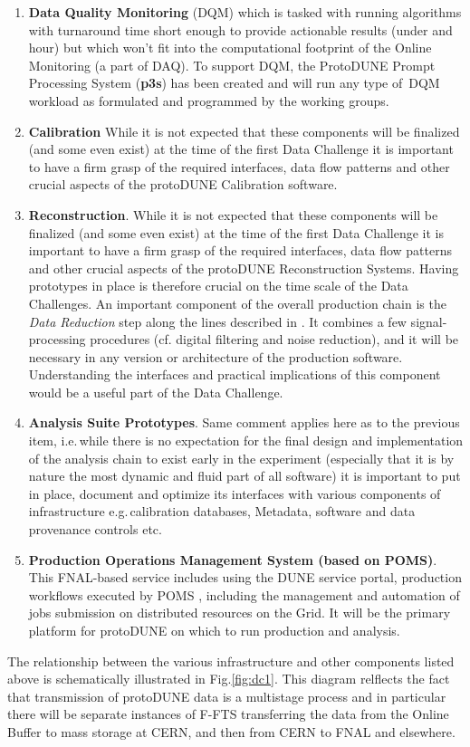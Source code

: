 \documentclass[pdftex,12pt,letter]{article}
\newcommand{\pd}{protoDUNE\xspace}
\begin{document}
\begin{enumerate}
\item \textbf{Data Quality Monitoring} (DQM) which is tasked with running algorithms with turnaround time short enough to provide
actionable results (under and hour) but which won't fit into the computational footprint of the Online Monitoring (a part of DAQ).
To support DQM, the ProtoDUNE Prompt Processing System (\textbf{p3s}) \cite{docdb1811,p3s} has been created and will run any type of\
DQM workload as formulated and programmed by the working groups.

\item \textbf{Calibration} While it is not expected that these components will be finalized
(and some even exist) at the time of the first Data Challenge it is important to have a firm grasp of the required interfaces,
data flow patterns and other crucial aspects of the \pd Calibration software.
 \item \textbf{Reconstruction}. While it is not expected that these components will be finalized
(and some even exist) at the time of the first Data Challenge it is important to have a firm grasp of the required interfaces,
data flow patterns and other crucial aspects of the \pd Reconstruction Systems. Having prototypes in place is therefore crucial
on the time scale of the Data Challenges.
An important component of the overall production chain is the \textit{Data Reduction} step along the lines described
in \cite{docdb2089}. It combines a few signal-processing procedures (cf. digital filtering and noise reduction), and it will be
necessary in any version or architecture of the production software.
Understanding the interfaces and practical implications of this component would be a useful part of the Data Challenge.

\item \textbf{Analysis Suite Prototypes}. Same comment applies here as to the previous item, i.e.\,while there is no expectation
for the final design and implementation of the analysis chain to exist early in the experiment (especially that it is by nature the most
dynamic and fluid part of all software) it is important to put in place, document and optimize its interfaces with various components
of infrastructure e.g.\,calibration databases, Metadata, software and data provenance controls etc.

\item \textbf{Production Operations Management System (based on POMS)}. This FNAL-based service includes using the DUNE service portal, production workflows executed by POMS \cite{poms}, including the management and automation of  jobs
submission on distributed resources on the Grid. It will be the primary platform for \pd on which to run production and analysis.


\end{enumerate}
\noindent The relationship between the various infrastructure and other components listed above is schematically illustrated in
Fig.\ref{fig:dc1}. This diagram relflects the fact that transmission of \pd data is a multistage process and in particular there
will be separate instances of F-FTS transferring the data from the Online Buffer to mass storage at CERN, and then from
CERN to FNAL and elsewhere.
\end{document}
